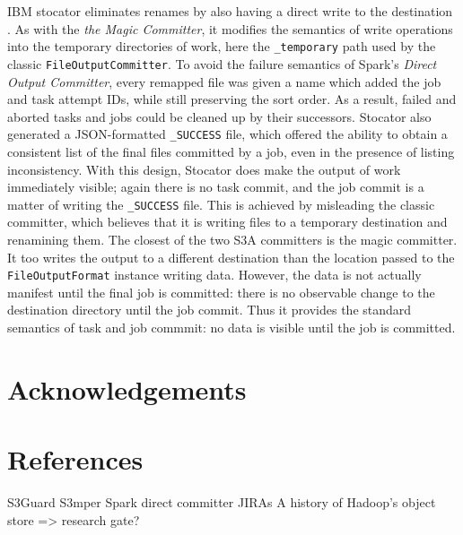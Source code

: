 \documentclass[9pt,technote]{IEEEtran}
\begin{document}
IBM stocator eliminates renames by also having a direct write to the destination  \cite{DBLP:journals/corr/abs-1709-01812}.
As with the \emph{the Magic Committer}, it modifies the semantics of write operations into the temporary directories of work, here the \texttt{\_temporary} path used by the classic \texttt{FileOutputCommitter}.
To avoid the failure semantics of Spark's \emph{Direct Output Committer}, every remapped file was given a name which added the job and task attempt IDs, while still preserving the sort order.
As a result, failed and aborted tasks and jobs could be cleaned up by their successors.
Stocator also generated a JSON-formatted \texttt{\_SUCCESS} file, which offered the ability to obtain a consistent list of the final files committed by a job, even in the presence of listing inconsistency.
With this design, Stocator does make the output of work immediately visible;
again there is no task commit, and the job commit is a matter of writing the \texttt{\_SUCCESS} file.
This is achieved by misleading the classic committer, which believes that it is writing files to a temporary destination and renamining them.
The closest of the two S3A committers is the magic committer.
It too writes the output to a different destination than the location passed to the \texttt{FileOutputFormat} instance writing data.
However, the data is not actually manifest until the final job is committed: there is no observable change to the destination directory until the job commit.
Thus it provides the standard semantics of task and job commmit: no data is visible until the job is committed.



\section{Acknowledgements}

\section{References}




S3Guard
S3mper
Spark direct committer JIRAs
A history of Hadoop's object store => research gate?
\end{document}
